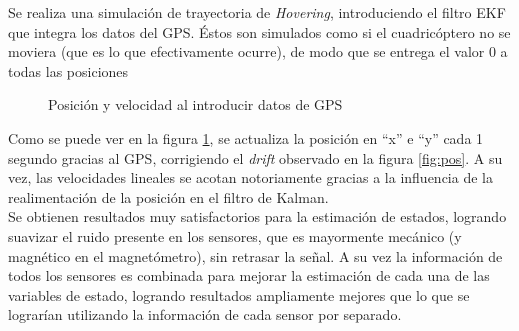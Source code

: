 \documentclass[main]{subfiles}
\begin{document}
Se realiza una simulación de trayectoria de \emph{Hovering}, introduciendo el filtro EKF que integra los datos del GPS. Éstos son simulados como si el cuadricóptero no se moviera (que es lo que efectivamente ocurre), de modo que se entrega el valor 0 a todas las posiciones

\begin{figure} [h!]
	\centering
		 \hspace{10pt}
		\caption{Posición y velocidad al introducir datos de GPS}
		\label{fig:gps_posyvel}
\end{figure}

Como se puede ver en la figura \ref{fig:gps_posyvel}, se actualiza la posición en ``x'' e ``y'' cada 1 segundo gracias al GPS, corrigiendo el \emph{drift} observado en la figura \ref{fig:pos}. A su vez, las velocidades lineales se acotan notoriamente gracias a la influencia de la realimentación de la posición en el filtro de Kalman.\\

Se obtienen resultados muy satisfactorios para la estimación de estados, logrando suavizar el ruido presente en los sensores, que es mayormente mecánico (y magnético en el magnetómetro), sin retrasar la señal. A su vez la información de todos los sensores es combinada para mejorar la estimación de cada una de las variables de estado, logrando resultados ampliamente mejores que lo que se lograrían utilizando la información de cada sensor por separado.
\end{document}
